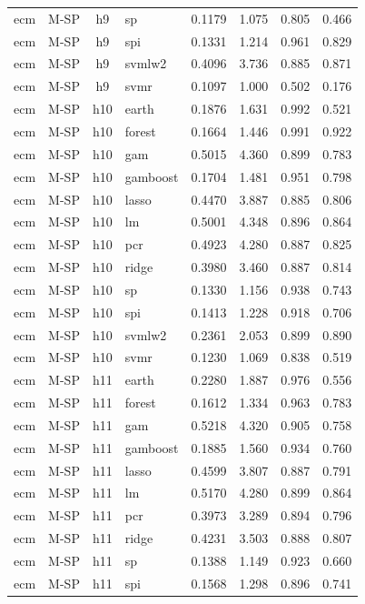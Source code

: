 \begin{ThreePartTable}
\begin{longtable}[t]{llclcccc}
ecm & M-SP & h9 & sp & 0.1179 & 1.075 & 0.805 & 0.466\\
ecm & M-SP & h9 & spi & 0.1331 & 1.214 & 0.961 & 0.829\\
ecm & M-SP & h9 & svmlw2 & 0.4096 & 3.736 & 0.885 & 0.871\\
ecm & M-SP & h9 & svmr & 0.1097 & 1.000 & 0.502 & 0.176\\
\addlinespace
ecm & M-SP & h10 & earth & 0.1876 & 1.631 & 0.992 & 0.521\\
ecm & M-SP & h10 & forest & 0.1664 & 1.446 & 0.991 & 0.922\\
ecm & M-SP & h10 & gam & 0.5015 & 4.360 & 0.899 & 0.783\\
ecm & M-SP & h10 & gamboost & 0.1704 & 1.481 & 0.951 & 0.798\\
ecm & M-SP & h10 & lasso & 0.4470 & 3.887 & 0.885 & 0.806\\
ecm & M-SP & h10 & lm & 0.5001 & 4.348 & 0.896 & 0.864\\
ecm & M-SP & h10 & pcr & 0.4923 & 4.280 & 0.887 & 0.825\\
ecm & M-SP & h10 & ridge & 0.3980 & 3.460 & 0.887 & 0.814\\
ecm & M-SP & h10 & sp & 0.1330 & 1.156 & 0.938 & 0.743\\
ecm & M-SP & h10 & spi & 0.1413 & 1.228 & 0.918 & 0.706\\
ecm & M-SP & h10 & svmlw2 & 0.2361 & 2.053 & 0.899 & 0.890\\
ecm & M-SP & h10 & svmr & 0.1230 & 1.069 & 0.838 & 0.519\\
\addlinespace
ecm & M-SP & h11 & earth & 0.2280 & 1.887 & 0.976 & 0.556\\
ecm & M-SP & h11 & forest & 0.1612 & 1.334 & 0.963 & 0.783\\
ecm & M-SP & h11 & gam & 0.5218 & 4.320 & 0.905 & 0.758\\
ecm & M-SP & h11 & gamboost & 0.1885 & 1.560 & 0.934 & 0.760\\
ecm & M-SP & h11 & lasso & 0.4599 & 3.807 & 0.887 & 0.791\\
ecm & M-SP & h11 & lm & 0.5170 & 4.280 & 0.899 & 0.864\\
ecm & M-SP & h11 & pcr & 0.3973 & 3.289 & 0.894 & 0.796\\
ecm & M-SP & h11 & ridge & 0.4231 & 3.503 & 0.888 & 0.807\\
ecm & M-SP & h11 & sp & 0.1388 & 1.149 & 0.923 & 0.660\\
ecm & M-SP & h11 & spi & 0.1568 & 1.298 & 0.896 & 0.741\\

\end{longtable}
\end{ThreePartTable}

